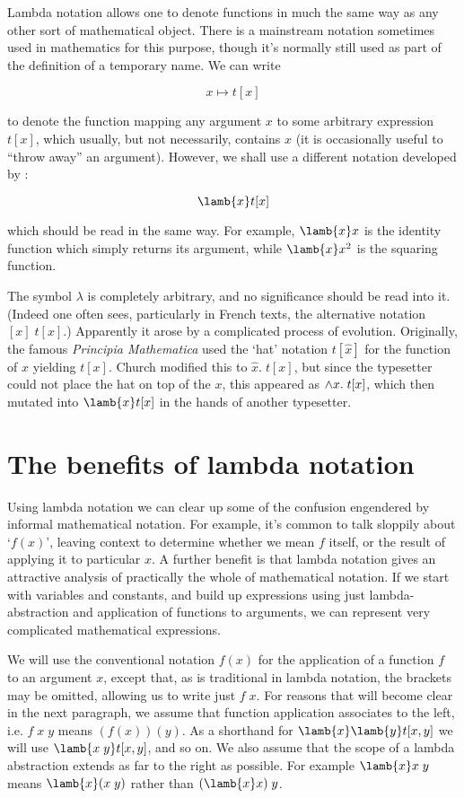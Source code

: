 Lambda notation allows one to denote functions in much the same way as any
other sort of mathematical object. There is a mainstream notation sometimes
used in mathematics for this purpose, though it's normally still used as part
of the definition of a temporary name. We can write

$$ x \mapsto t[x] $$

\noindent to denote the function mapping any argument $x$ to some arbitrary
expression $t[x]$, which usually, but not necessarily, contains $x$ (it is
occasionally useful to ``throw away'' an argument). However, we shall use a
different notation developed by :

$$ \lamb{x} t[x]$$

\noindent which should be read in the same way. For example, $\lamb{x} x$ is
the identity function which simply returns its argument, while $\lamb{x} x^2$
is the squaring function.

The symbol $\lambda$ is completely arbitrary, and no significance should be
read into it. (Indeed one often sees, particularly in French texts, the
alternative notation $[x]\; t[x]$.) Apparently it arose by a complicated
process of evolution. Originally, the famous {\em Principia Mathematica}
\cite{whitehead-principia} used the `hat' notation $t[\hat{x}]$ for the
function of $x$ yielding $t[x]$. Church modified this to $\hat{x}.\;t[x]$, but
since the typesetter could not place the hat on top of the $x$, this appeared
as ${\tiny \wedge} x.\;t[x]$, which then mutated into $\lamb{x} t[x]$ in the
hands of another typesetter.

\section{The benefits of lambda notation}

Using lambda notation we can clear up some of the confusion engendered by
informal mathematical notation. For example, it's common to talk sloppily about
`$f(x)$', leaving context to determine whether we mean $f$ itself, or the
result of applying it to particular $x$. A further benefit is that lambda
notation gives an attractive analysis of practically the whole of mathematical
notation. If we start with variables and constants, and build up expressions
using just lambda-abstraction and application of functions to arguments, we can
represent very complicated mathematical expressions.

We will use the conventional notation $f(x)$ for the application of a function
$f$ to an argument $x$, except that, as is traditional in lambda notation, the
brackets may be omitted, allowing us to write just $f\;x$. For reasons that
will become clear in the next paragraph, we assume that function application
associates to the left, i.e. $f\;x\;y$ means $(f(x))(y)$. As a shorthand for
$\lamb{x} \lamb{y} t[x,y]$ we will use $\lamb{x\;y} t[x,y]$, and so on. We also
assume that the scope of a lambda abstraction extends as far to the right as
possible. For example $\lamb{x} x\; y$ means $\lamb{x} (x\; y)$ rather than
$(\lamb{x} x)\; y$.

